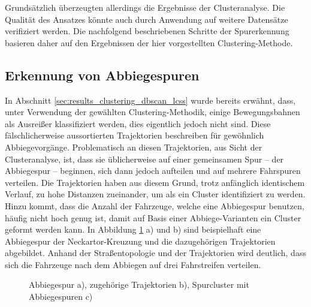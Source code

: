 Grundsätzlich überzeugten allerdings die Ergebnisse der Clusteranalyse. Die Qualität des Ansatzes könnte auch
durch Anwendung auf weitere Datensätze verifiziert werden. Die nachfolgend beschriebenen Schritte der Spurerkennung
basieren daher auf den Ergebnissen der hier vorgestellten Clustering-Methode.

\subsection{Erkennung von Abbiegespuren}
\label{sec:real_detect_turning_lane}

In Abschnitt \ref{sec:results_clustering_dbscan_lcss} wurde bereits erwähnt, dass, unter Verwendung der
gewählten Clustering-Methodik, einige Bewegungsbahnen als Ausreißer klassifiziert werden, dies eigentlich jedoch
nicht sind. Diese fälschlicherweise aussortierten Trajektorien beschreiben für gewöhnlich Abbiegevorgänge.
Problematisch an diesen Trajektorien, aus Sicht der Clusteranalyse, ist, dass sie üblicherweise auf einer
gemeinsamen Spur -- der Abbiegespur -- beginnen, sich dann jedoch aufteilen und auf mehrere Fahrspuren verteilen.
Die Trajektorien haben aus diesem Grund, trotz anfänglich identischem Verlauf, zu hohe Distanzen zueinander, um
als ein Cluster identifiziert zu werden. Hinzu kommt, dass die Anzahl der Fahrzeuge, welche eine Abbiegespur
benutzen, häufig nicht hoch genug ist, damit auf Basis einer Abbiege-Varianten ein Cluster geformt werden kann.
In Abbildung \ref{fig:real_turning_lane} a) und b) sind beispielhaft eine Abbiegespur der Neckartor-Kreuzung und
die dazugehörigen Trajektorien abgebildet. Anhand der Straßentopologie und der Trajektorien wird deutlich,
dass sich die Fahrzeuge nach dem Abbiegen auf drei Fahrstreifen verteilen.

\begin{figure}[H]
    \centering
    \qquad \qquad \qquad
    \caption[Abbiegespur Neckartor Kreuzung]{Abbiegespur a), zugehörige Trajektorien b), Spurcluster mit Abbiegespuren c)}
    \label{fig:real_turning_lane}
\end{figure}

